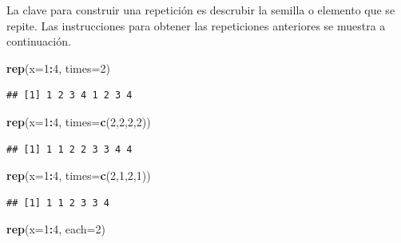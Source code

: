 \documentclass[10pt,]{krantz}
\makeatletter
\newenvironment{Shaded}{\begin{snugshade}}{\end{snugshade}}
\newcommand{\KeywordTok}[1]{\textcolor[rgb]{0.13,0.29,0.53}{\textbf{#1}}}
\newcommand{\DataTypeTok}[1]{\textcolor[rgb]{0.13,0.29,0.53}{#1}}
\newcommand{\DecValTok}[1]{\textcolor[rgb]{0.00,0.00,0.81}{#1}}
\newcommand{\OperatorTok}[1]{\textcolor[rgb]{0.81,0.36,0.00}{\textbf{#1}}}
\newcommand{\NormalTok}[1]{#1}
\newenvironment{kframe}{%
\medskip{}
\setlength{\fboxsep}{.8em}
 \def\at@end@of@kframe{}%
 \ifinner\ifhmode%
  \def\at@end@of@kframe{\end{minipage}}%
  \begin{minipage}{\columnwidth}%
 \fi\fi%
 \def\FrameCommand##1{\hskip\@totalleftmargin \hskip-\fboxsep
 \colorbox{shadecolor}{##1}\hskip-\fboxsep
     \hskip-\linewidth \hskip-\@totalleftmargin \hskip\columnwidth}%
 \MakeFramed {\advance\hsize-\width
   \@totalleftmargin\z@ \linewidth\hsize
   \@setminipage}}%
 {\par\unskip\endMakeFramed%
 \at@end@of@kframe}
\renewenvironment{Shaded}{\begin{kframe}}{\end{kframe}}
\makeatother
\begin{document}
La clave para construir una repetición es descrubir la semilla o
elemento que se repite. Las instrucciones para obtener las repeticiones
anteriores se muestra a continuación.

\begin{Shaded}
\begin{Highlighting}[]
\KeywordTok{rep}\NormalTok{(}\DataTypeTok{x=}\DecValTok{1}\OperatorTok{:}\DecValTok{4}\NormalTok{, }\DataTypeTok{times=}\DecValTok{2}\NormalTok{)}
\end{Highlighting}
\end{Shaded}

\begin{verbatim}
## [1] 1 2 3 4 1 2 3 4
\end{verbatim}

\begin{Shaded}
\begin{Highlighting}[]
\KeywordTok{rep}\NormalTok{(}\DataTypeTok{x=}\DecValTok{1}\OperatorTok{:}\DecValTok{4}\NormalTok{, }\DataTypeTok{times=}\KeywordTok{c}\NormalTok{(}\DecValTok{2}\NormalTok{,}\DecValTok{2}\NormalTok{,}\DecValTok{2}\NormalTok{,}\DecValTok{2}\NormalTok{))}
\end{Highlighting}
\end{Shaded}

\begin{verbatim}
## [1] 1 1 2 2 3 3 4 4
\end{verbatim}

\begin{Shaded}
\begin{Highlighting}[]
\KeywordTok{rep}\NormalTok{(}\DataTypeTok{x=}\DecValTok{1}\OperatorTok{:}\DecValTok{4}\NormalTok{, }\DataTypeTok{times=}\KeywordTok{c}\NormalTok{(}\DecValTok{2}\NormalTok{,}\DecValTok{1}\NormalTok{,}\DecValTok{2}\NormalTok{,}\DecValTok{1}\NormalTok{))}
\end{Highlighting}
\end{Shaded}

\begin{verbatim}
## [1] 1 1 2 3 3 4
\end{verbatim}

\begin{Shaded}
\begin{Highlighting}[]
\KeywordTok{rep}\NormalTok{(}\DataTypeTok{x=}\DecValTok{1}\OperatorTok{:}\DecValTok{4}\NormalTok{, }\DataTypeTok{each=}\DecValTok{2}\NormalTok{)}
\end{Highlighting}
\end{Shaded}
\end{document}
